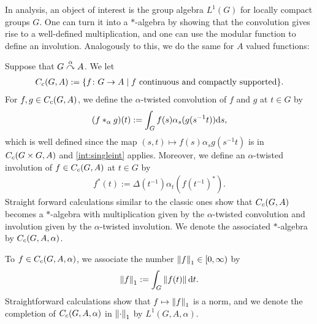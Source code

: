 In analysis, an object of interest is the group algebra $L^1(G)$ for locally compact groups $G$. One can turn it into a $*$-algebra by showing that the convolution gives rise to a well-defined multiplication, and one can use the modular function to define an involution. Analogously to this, we do the same for $A$ valued functions:
\begin{definition}
Suppose that $G \stackrel{\alpha}{\curvearrowright} A$. We let 
\begin{align*}
	C_c(G,A):=\{ f \colon G \to A \mid f \text{ continuous and compactly supported}\}.
\end{align*}
For $f,g \in C_c(G,A)$, we define the $\alpha$-twisted convolution of $f$ and $g$ at $t \in G$ by
\begin{align*}
	(f \ast_\alpha g)(t):= \int_G  f(s) \alpha_s(g(s^{-1}t)) \mathrm{d} s,
\end{align*}
which is well defined since the map $(s,t) \mapsto f(s) \alpha_s g(s^{-1}t)$ is in $C_c(G \times G , A)$ and \cref{int:singleint} applies. Moreover, we define an $\alpha$-twisted involution of $f \in C_c(G,A)$ at $t \in G$ by
\begin{align*}
	f^*(t):=\Delta(t^{-1}) \alpha_t(f(t^{-1})^*).
\end{align*}
Straight forward calculations similar to the classic ones show that $C_c(G,A)$ becomes a $*$-algebra with multiplication given by the $\alpha$-twisted convolution and involution given by the $\alpha$-twisted involution. We denote the associated $*$-algebra by $C_c(G,A,\alpha)$.

To $f \in C_c(G,A,\alpha)$, we associate the number $\left\lVert f \right\rVert_1 \in [0, \infty)$ by
	\begin{align*}
		\left\lVert f \right\rVert_1 := \int_G \left\lVert f(t) \right\rVert \mathrm{d} t.
	\end{align*}
Straightforward calculations show that $f \mapsto \left\lVert f \right\rVert_1$ is a norm, and we denote the completion of $C_c(G,A,\alpha)$ in $\left\lVert \cdot \right\rVert_1$ by $L^1(G,A,\alpha)$.
\end{definition}


